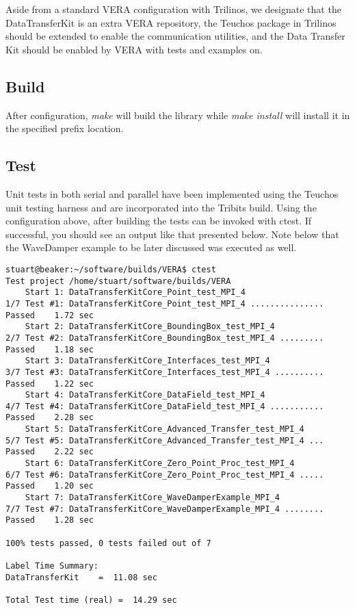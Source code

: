 \documentclass[letterpaper]{article}
\begin{document}
Aside from a standard VERA configuration with Trilinos, we designate
that the DataTransferKit is an extra VERA repository, the Teuchos package in
Trilinos should be extended to enable the communication utilities, and
the Data Transfer Kit should be enabled by VERA with tests and examples
on.

\subsection{Build}

After configuration, {\sl make} will build the library while {\sl make
  install} will install it in the specified prefix location.

\subsection{Test}
Unit tests in both serial and parallel have been implemented using the
Teuchos unit testing harness and are incorporated into the Tribits
build. Using the configuration above, after building the tests can be
invoked with ctest. If successful, you should see an output like that
presented below. Note below that the WaveDamper example to be later
discussed was executed as well.

\begin{verbatim}
stuart@beaker:~/software/builds/VERA$ ctest
Test project /home/stuart/software/builds/VERA
    Start 1: DataTransferKitCore_Point_test_MPI_4
1/7 Test #1: DataTransferKitCore_Point_test_MPI_4 ...............   Passed    1.72 sec
    Start 2: DataTransferKitCore_BoundingBox_test_MPI_4
2/7 Test #2: DataTransferKitCore_BoundingBox_test_MPI_4 .........   Passed    1.18 sec
    Start 3: DataTransferKitCore_Interfaces_test_MPI_4
3/7 Test #3: DataTransferKitCore_Interfaces_test_MPI_4 ..........   Passed    1.22 sec
    Start 4: DataTransferKitCore_DataField_test_MPI_4
4/7 Test #4: DataTransferKitCore_DataField_test_MPI_4 ...........   Passed    2.28 sec
    Start 5: DataTransferKitCore_Advanced_Transfer_test_MPI_4
5/7 Test #5: DataTransferKitCore_Advanced_Transfer_test_MPI_4 ...   Passed    2.22 sec
    Start 6: DataTransferKitCore_Zero_Point_Proc_test_MPI_4
6/7 Test #6: DataTransferKitCore_Zero_Point_Proc_test_MPI_4 .....   Passed    1.20 sec
    Start 7: DataTransferKitCore_WaveDamperExample_MPI_4
7/7 Test #7: DataTransferKitCore_WaveDamperExample_MPI_4 ........   Passed    1.28 sec

100% tests passed, 0 tests failed out of 7

Label Time Summary:
DataTransferKit    =  11.08 sec

Total Test time (real) =  14.29 sec
\end{verbatim}
\end{document}
